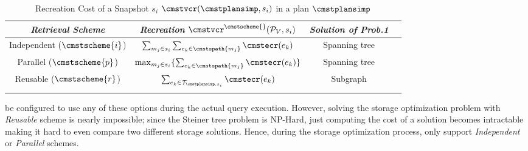 \documentclass[conference]{IEEEtran}
\begin{document}
\begin{table}[!h]
\centering
\begin{tabular}{cccc} 
\toprule
\emph{Retrieval Scheme} & \emph{Recreation} $\cmstvcr^{\cmstscheme{}}(\mathcal{P}_V, s_i)$ & \emph{Solution of Prob.1}
\\ %
\midrule
Independent ($\cmstscheme{i}$) & $\sum_{m_j \in s_i} \sum_{e_k \in \cmstspath{m_j}} \cmstecr(e_k) $ & Spanning tree \\ 
Parallel ($\cmstscheme{p}$) & $\max_{m_j \in s_i}\{\sum_{e_k \in \cmstspath{m_j}} \cmstecr(e_k)\}$ & Spanning tree  \\ 
Reusable ($\cmstscheme{r}$) & $\sum_{e_k \in \mathcal{T}_{\cmstplansimp, s_i}} \cmstecr(e_k)$ & Subgraph \\ 
\bottomrule
\vspace{0.1mm}
\end{tabular}
\caption{Recreation Cost of a Snapshot $s_i$ $\cmstvcr(\cmstplansimp,s_i)$ in a plan $\cmstplansimp$}
\label{tb:steiner_tree}
\end{table}

\weightstore\can be configured to use any of these options during the actual query execution. 
However, solving the storage optimization problem with {\em Reusable} scheme is nearly impossible; since the Steiner tree problem is NP-Hard, just computing the cost of a solution becomes intractable making it hard to even compare two different storage solutions. Hence, during the storage optimization process, \weightstore\can only support {\em Independent} or {\em Parallel} schemes. 

\end{document}
